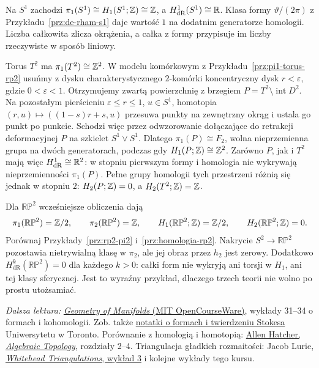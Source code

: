\begin{przyklad}
Na $S^1$ zachodzi
$\pi_1(S^1)\cong H_1(S^1;\mathbb{Z})\cong\mathbb{Z}$,
a $H^1_{\mathrm{dR}}(S^1)\cong\mathbb{R}$.
Klasa formy $\vartheta/(2\pi)$ z
Przykładu~\ref{prz:de-rham-s1} daje wartość
$1$ na dodatnim generatorze homologii.
Liczba całkowita zlicza okrążenia, a całka
z formy przypisuje im liczby rzeczywiste
w sposób liniowy.
\end{przyklad}

\begin{przyklad}
Torus $T^2$ ma $\pi_1(T^2)\cong\mathbb{Z}^2$.
W modelu komórkowym z Przykładu~\ref{prz:pi1-torus-rp2}
usuńmy z dysku charakterystycznego $2$-komórki
koncentryczny dysk $r<\varepsilon$, gdzie $0<\varepsilon<1$.
Otrzymujemy zwartą powierzchnię z brzegiem
$P=T^2\setminus\operatorname{int}D^2$.
Na pozostałym pierścieniu $\varepsilon\leq r\leq1$,
$u\in S^1$, homotopia $(r,u)\mapsto((1-s)r+s,u)$
przesuwa punkty na zewnętrzny okrąg i ustala go punkt po punkcie.
Schodzi więc przez odwzorowanie dołączające do retrakcji
deformacyjnej $P$ na szkielet $S^1\vee S^1$.
Dlatego $\pi_1(P)\cong F_2$, wolna
nieprzemienna grupa na dwóch generatorach,
podczas gdy $H_1(P;\mathbb{Z})\cong\mathbb{Z}^2$.
Zarówno $P$, jak i $T^2$ mają więc
$H^1_{\mathrm{dR}}\cong\mathbb{R}^2$:
w stopniu pierwszym formy i homologia
nie wykrywają nieprzemienności $\pi_1(P)$.
Pełne grupy homologii tych przestrzeni
różnią się jednak w stopniu $2$:
$H_2(P;\mathbb{Z})=0$, a $H_2(T^2;\mathbb{Z})=\mathbb{Z}$.
\end{przyklad}

\begin{przyklad}
Dla $\mathbb{RP}^2$ wcześniejsze obliczenia dają
\[
 \pi_1(\mathbb{RP}^2)=\mathbb{Z}/2,\qquad
 \pi_2(\mathbb{RP}^2)=\mathbb{Z},\qquad
 H_1(\mathbb{RP}^2;\mathbb{Z})=\mathbb{Z}/2,\qquad
 H_2(\mathbb{RP}^2;\mathbb{Z})=0.
\]
Porównaj Przykłady~\ref{prz:rp2-pi2}
i~\ref{prz:homologia-rp2}. Nakrycie
$S^2\to\mathbb{RP}^2$ pozostawia nietrywialną
klasę w $\pi_2$, ale jej obraz przez $h_2$
jest zerowy. Dodatkowo
$H^k_{\mathrm{dR}}(\mathbb{RP}^2)=0$
dla każdego $k>0$: całki form nie wykryją
ani torsji w $H_1$, ani tej klasy sferycznej.
Jest to wyraźny przykład, dlaczego trzech teorii
nie wolno po prostu utożsamiać.
\end{przyklad}

\par\smallskip
{\footnotesize\noindent\emph{Dalsza lektura:}
\href{https://ocw.mit.edu/courses/18-965-geometry-of-manifolds-fall-2004/pages/lecture-notes/}
{\emph{Geometry of Manifolds} (MIT OpenCourseWare)},
wykłady 31--34 o formach i kohomologii.
Zob. także \href{https://www.math.toronto.edu/mgualt/courses/17-1300/docs/17-1300-notes-13.pdf}
{notatki o formach i twierdzeniu Stokesa}
Uniwersytetu w Toronto.
Porównanie z homologią i homotopią:
\href{https://pi.math.cornell.edu/~hatcher/AT/AT.pdf}
{Allen Hatcher, \emph{Algebraic Topology}},
rozdziały 2--4. Triangulacja gładkich rozmaitości: Jacob Lurie,
\href{https://www.math.ias.edu/~lurie/937notes/937Lecture3.pdf}
{\emph{Whitehead Triangulations}, wykład 3} i kolejne
wykłady tego kursu.\par}

